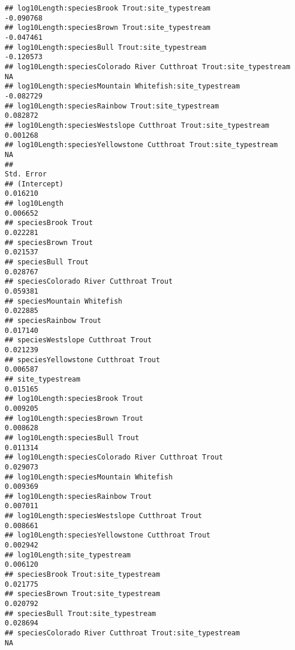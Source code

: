 \documentclass[
  landscape]{article}
\begin{document}
\begin{verbatim}
## log10Length:speciesBrook Trout:site_typestream                    -0.090768
## log10Length:speciesBrown Trout:site_typestream                    -0.047461
## log10Length:speciesBull Trout:site_typestream                     -0.120573
## log10Length:speciesColorado River Cutthroat Trout:site_typestream        NA
## log10Length:speciesMountain Whitefish:site_typestream             -0.082729
## log10Length:speciesRainbow Trout:site_typestream                   0.082872
## log10Length:speciesWestslope Cutthroat Trout:site_typestream       0.001268
## log10Length:speciesYellowstone Cutthroat Trout:site_typestream           NA
##                                                                   Std. Error
## (Intercept)                                                         0.016210
## log10Length                                                         0.006652
## speciesBrook Trout                                                  0.022281
## speciesBrown Trout                                                  0.021537
## speciesBull Trout                                                   0.028767
## speciesColorado River Cutthroat Trout                               0.059381
## speciesMountain Whitefish                                           0.022885
## speciesRainbow Trout                                                0.017140
## speciesWestslope Cutthroat Trout                                    0.021239
## speciesYellowstone Cutthroat Trout                                  0.006587
## site_typestream                                                     0.015165
## log10Length:speciesBrook Trout                                      0.009205
## log10Length:speciesBrown Trout                                      0.008628
## log10Length:speciesBull Trout                                       0.011314
## log10Length:speciesColorado River Cutthroat Trout                   0.029073
## log10Length:speciesMountain Whitefish                               0.009369
## log10Length:speciesRainbow Trout                                    0.007011
## log10Length:speciesWestslope Cutthroat Trout                        0.008661
## log10Length:speciesYellowstone Cutthroat Trout                      0.002942
## log10Length:site_typestream                                         0.006120
## speciesBrook Trout:site_typestream                                  0.021775
## speciesBrown Trout:site_typestream                                  0.020792
## speciesBull Trout:site_typestream                                   0.028694
## speciesColorado River Cutthroat Trout:site_typestream                     NA

\end{verbatim}
\end{document}
